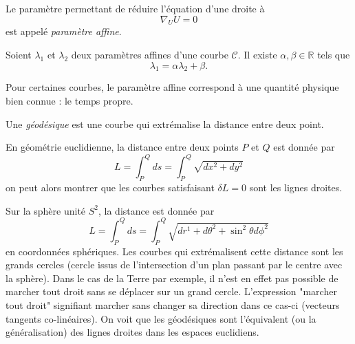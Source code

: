 \documentclass[a4paper,11pt]{report}
\begin{document}
            \begin{defn}
                Le paramètre permettant de réduire l'équation d'une droite à 
                \begin{equation}
                    \nabla_U U = 0
                \end{equation}
                est appelé \textit{paramètre affine}.
            \end{defn}
            
            \begin{prop}\begin{leftbar}
                Soient $\lambda_1$ et $\lambda_2$ deux paramètres affines d'une courbe $\mathscr{C}$. Il existe $\alpha,\beta\in\mathbb{R}$ tels que
                \begin{equation}
                    \lambda_1 = \alpha\lambda_2+\beta.
                \end{equation}
            \end{leftbar}\end{prop}
            
            Pour certaines courbes, le paramètre affine correspond à une quantité physique bien connue : le temps propre.
            
            \begin{defn}
                Une \textit{géodésique} est une courbe qui extrémalise la distance entre deux point.
            \end{defn}
            
            \begin{exmp}
                En géométrie euclidienne, la distance entre deux points $P$ et $Q$ est donnée par 
                \begin{equation}
                    L = \int_P^Q ds = \int_P^Q \sqrt{dx^2+dy^2}
                \end{equation}
                on peut alors montrer que les courbes satisfaisant $\delta L = 0$ sont les lignes droites.
            \end{exmp}
            
            \begin{exmp}
                Sur la sphère unité $S^2$, la distance est donnée par
                \begin{equation}
                    L = \int_P^Qds = \int_P^Q\sqrt{dr^1+d\theta^2+\sin^2\theta d\phi^2}
                \end{equation}
                en coordonnées sphériques. Les courbes qui extrémalisent cette distance sont les grands cercles (cercle issus de l'intersection d'un plan passant par le centre avec la sphère). Dans le cas de la Terre par exemple, il n'est en effet pas possible de marcher tout droit sans se déplacer sur un grand cercle. L'expression "marcher tout droit" signifiant marcher sans changer sa direction dans ce cas-ci (vecteurs tangents co-linéaires). On voit que les géodésiques sont l'équivalent (ou la généralisation) des lignes droites dans les espaces euclidiens.
            \end{exmp}
            
\end{document}

